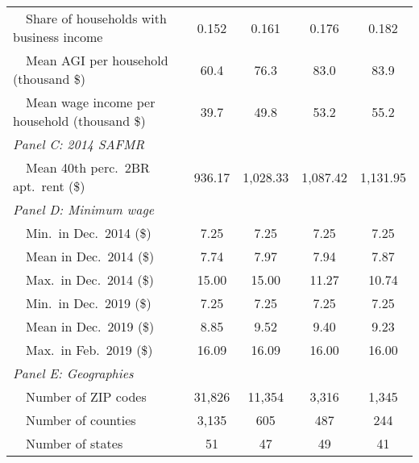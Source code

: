 \begin{landscape}
\begin{table}[hbt!]
\begin{tabular}{@{}lcccc@{}}
        $\quad$Share of households with business income      & 0.152    & 0.161   & 0.176   & 0.182          \\
        $\quad$Mean AGI per household (thousand \$)          & 60.4 & 76.3 & 83.0 & 83.9     \\
        $\quad$Mean wage income per household (thousand \$)  & 39.7 & 49.8 & 53.2 & 55.2     \\
        \textit{Panel C: 2014 SAFMR}                         &       &       &        &               \\
        $\quad$Mean 40th perc.\ 2BR apt.\ rent (\$)          & 936.17   & 1,028.33  & 1,087.42  & 1,131.95          \\
        \textit{Panel D: Minimum wage}                       &       &       &        &              \\
        $\quad$Min.\ in Dec.\ 2014 (\$)                      & 7.25   & 7.25  & 7.25  & 7.25         \\
        $\quad$Mean in Dec.\ 2014 (\$)                       & 7.74   & 7.97  & 7.94  & 7.87         \\
        $\quad$Max.\ in Dec.\ 2014 (\$)                      & 15.00   & 15.00  & 11.27  & 10.74         \\
        $\quad$Min.\ in Dec.\ 2019 (\$)                      & 7.25   & 7.25  & 7.25  & 7.25         \\
        $\quad$Mean in Dec.\ 2019 (\$)                       & 8.85   & 9.52  & 9.40  & 9.23         \\
        $\quad$Max.\ in Feb.\ 2019 (\$)                      & 16.09   & 16.09  & 16.00  & 16.00         \\
        \textit{Panel E: Geographies}                        &       &       &        &               \\
        $\quad$Number of ZIP codes                           & 31,826  & 11,354 & 3,316 & 1,345             \\
        $\quad$Number of counties                            & 3,135  & 605 & 487 & 244             \\
        $\quad$Number of states                              & 51  & 47 & 49 & 41             \\ \bottomrule
    \end{tabular}


\end{table}
\end{landscape}
